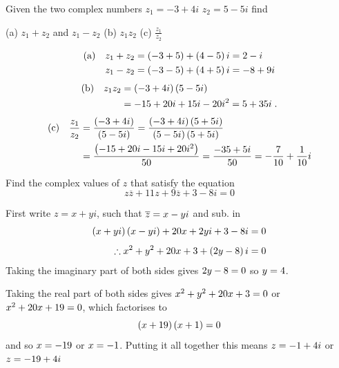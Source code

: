 \goodbreak
\begin{example}[Lecture]
\label{ex:521}
Given the two complex numbers ${z}_{1}=-3+4i$ ${z}_{2}=5-5i$ find

(a) ${z}_{1}+{z}_{2}$ and ${z}_{1}-{z}_{2}$ \qquad (b) ${z}_{1}{z}_{2}$ \qquad (c) $\frac{{z}_{1}}{{z}_{2}}$
\end{example}
\begin{solution}
\begin{align*}
\text{(a)}\quad {z}_{1}+{z}_{2} = \left(-3+5\right)+\left(4-5\right)i&=2-i\\
{z}_{1}-{z}_{2} = \left(-3-5\right)+\left(4+5\right)i &=-8+9i
\end{align*}
\begin{align*}
\text{(b)}\quad {z}_{1}{z}_{2} &=\left(-3+4i\right)\left(5-5i\right)\\
&=-15+20i+15i-20{i}^{2} =5+35i \; .
\end{align*}
\begin{align*}
\text{(c)}\quad \frac{{z}_{1}}{{z}_{2}} &=\frac{\left(-3+4i\right)}{\left(5-5i\right)} = \frac{\left(-3+4i\right)(5+5i)}{\left(5-5i\right)(5+5i)} \\
&=\frac{\left(-15+20i-15i+20{i}^{2}\right)}{50} =\frac{-35+5i}{50}=-\frac{7}{10}+\frac{1}{10}i
\end{align*}
\end{solution}

\goodbreak
\begin{example}[Video]
\label{ex:522}
Find the complex values of $z$ that satisfy the equation
\[
z\overline{z}+11z+9\overline{z}+3-8i=0
\]
\end{example}

\begin{solution}
First write $z=x+yi$, such that $\overline{z}=x-yi$ and sub. in
\begin{align*}
    \left(x+yi\right)\left(x-yi\right)+20x+2yi+3-8i&=0 \\[4pt]
    \therefore {x}^{2}+{y}^{2}+20x+3+\left(2y-8\right)i&=0
\end{align*}
Taking the imaginary part of both sides gives $2y-8=0$ so $y=4$.

Taking the real part of both sides gives ${x}^{2}+{y}^{2}+20x+3=0$ or ${x}^{2}+20x+19 =0$, which factorises to
\[
\left(x+19\right)\left(x+1\right)=0
\]
and so $x=-19$ or $x=-1$. Putting it all together this means $z=-1+4i$ or $z=-19+4i$
\end{solution}

